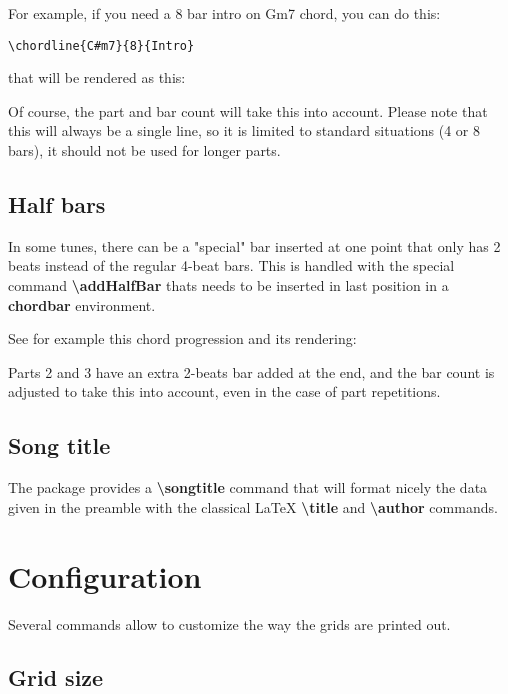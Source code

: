 \documentclass[11pt]{article}
\newcommand{\btt}{\bfseries \ttfamily }
\newcommand{\tbs}{\textbackslash{}}
\begin{document}
For example, if you need a 8 bar intro on Gm7 chord, you can do this:
\begin{lstlisting}
\chordline{C#m7}{8}{Intro}
\end{lstlisting}

that will be rendered as this:


Of course, the part and bar count will take this into account.
Please note that this will always be a single line, so it is limited to standard situations (4 or 8 bars), it should not be used for longer parts.

\subsection{Half bars}

In some tunes, there can be a "special" bar inserted at one point that only has 2 beats instead of the regular 4-beat bars.
This is handled with the special command {\btt \tbs addHalfBar} thats needs to be inserted in last position in a {\btt chordbar} environment.

See for example this chord progression and its rendering:



\resetchordbars
\countbarsYes


Parts 2 and 3 have an extra 2-beats bar added at the end, and the bar count is adjusted to take this into account, even in the case of part repetitions.

\subsection{Song title}

The package provides a {\btt \tbs songtitle} command that will format nicely the data given in the preamble with the classical \LaTeX
{\btt \tbs title} and {\btt \tbs author} commands.


\section{Configuration}
\label{sec:config}

Several commands allow to customize the way the grids are printed out.

\subsection{Grid size}
\end{document}

